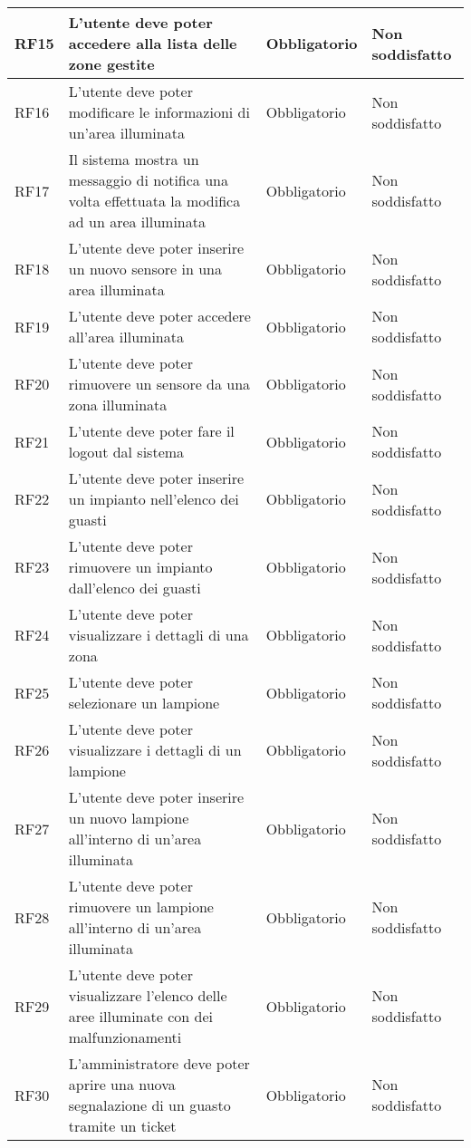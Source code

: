 \documentclass[12pt]{article}
\begin{document}
\begin{xltabular}{\linewidth}{|>{\hsize}X|>{\hsize}X|>{\hsize}X|>{\hsize}X|}
	\hline				
	RF15	 & L'utente deve poter accedere alla lista delle zone gestite	 & Obbligatorio	 & Non soddisfatto \\
	\hline				
	RF16	 & L'utente deve poter modificare le informazioni di un'area illuminata	 & Obbligatorio	 & Non soddisfatto \\
	\hline				
	RF17	 & Il sistema mostra un messaggio di notifica una volta effettuata la modifica ad un area illuminata & Obbligatorio	 & Non soddisfatto \\
	\hline				
	RF18	 & L'utente deve poter inserire un nuovo sensore in una area illuminata	 & Obbligatorio	 & Non soddisfatto \\
	\hline				
	RF19	 & L'utente deve poter accedere all'area illuminata	 & Obbligatorio	 & Non soddisfatto \\
	\hline 				
	RF20	 & L'utente deve poter rimuovere un sensore da una zona illuminata	 & Obbligatorio	 & Non soddisfatto \\
	\hline				
	RF21	 & L'utente deve poter fare il logout dal sistema	 & Obbligatorio	 & Non soddisfatto \\
	\hline										
	RF22	 & L'utente deve poter inserire un impianto nell'elenco dei guasti	 & Obbligatorio	 & Non soddisfatto \\
	\hline				
	RF23	 & L'utente deve poter rimuovere un impianto dall'elenco dei guasti	 & Obbligatorio	 & Non soddisfatto \\
	\hline				
	RF24	 & L'utente deve poter visualizzare i dettagli di una zona	 & Obbligatorio	 & Non soddisfatto \\
	\hline				
	RF25	 & L'utente deve poter selezionare un lampione	 & Obbligatorio	 & Non soddisfatto\\
	\hline				
	RF26	 & L'utente deve poter visualizzare i dettagli di un lampione	 & Obbligatorio	 & Non soddisfatto\\
	\hline				
	RF27	 & L'utente deve poter inserire un nuovo lampione all'interno di un'area illuminata	 & Obbligatorio	 & Non soddisfatto \\
	\hline				
	RF28	 & L'utente deve poter rimuovere un lampione all'interno di un'area illuminata	 & Obbligatorio	 & Non soddisfatto \\
	\hline				
	RF29	 & L'utente deve poter visualizzare l'elenco delle aree illuminate con dei malfunzionamenti	 & Obbligatorio	 & Non soddisfatto \\
	\hline				
	RF30	 & L'amministratore deve poter aprire una nuova segnalazione di un guasto tramite un ticket	 & Obbligatorio	 & Non soddisfatto \\

\end{xltabular}
\end{document}
